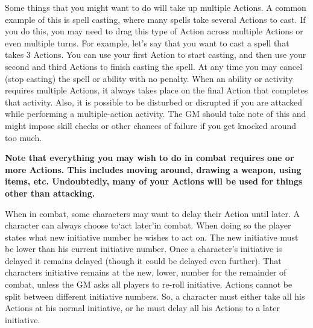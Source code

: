 \documentclass[twoside]{book}
\begin{document}
    {  
    Some things that you might want to do will take up multiple Actions. A common example of this is spell casting, where many spells take several Actions to cast. If you do this, you may need to drag this type of Action across multiple Actions or even multiple turns. For example, let's say that you want to cast a spell that takes 3 Actions. You can use your first Action to start casting, and then use your second and third Actions to finish casting the spell. At any time you may cancel (stop casting) the spell or ability with no penalty. When an ability or activity requires multiple Actions, it always takes place on the final Action that completes that activity. Also, it is possible to be disturbed or disrupted if you are attacked while performing a multiple-action activity. The GM should take note of this and might impose skill checks or other chances of failure if you get knocked around too much.
    }
  

 \textbf{Note that everything you may wish to do in combat requires one or more Actions. This includes moving around, drawing a weapon, using items, etc. Undoubtedly, many of your Actions will be used for things other than attacking.}


    {  
    When in combat, some characters may want to delay their Action until later. A character can always choose to`act later'in combat. When doing so the player states what new initiative number he wishes to act on. The new initiative must be lower than his current initiative number. Once a character's initiative is delayed it remains delayed (though it could be delayed even further). That characters initiative remains at the new, lower, number for the remainder of combat, unless the GM asks all players to re-roll initiative. Actions cannot be split between different initiative numbers. So, a character must either take all his Actions at his normal initiative, or he must delay all his Actions to a later initiative.
    }
  
  

  
\end{document}
